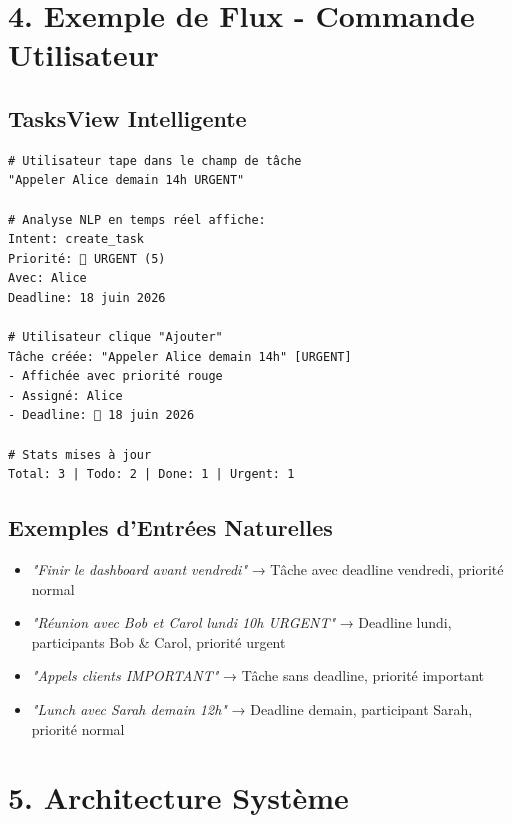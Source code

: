\documentclass[12pt,french]{article}
\begin{document}
\vspace{0.5cm}

\section*{4. Exemple de Flux - Commande Utilisateur}

\subsection*{TasksView Intelligente}
\begin{lstlisting}
# Utilisateur tape dans le champ de tâche
"Appeler Alice demain 14h URGENT"

# Analyse NLP en temps réel affiche:
Intent: create_task
Priorité: 🔴 URGENT (5)
Avec: Alice
Deadline: 18 juin 2026

# Utilisateur clique "Ajouter"
Tâche créée: "Appeler Alice demain 14h" [URGENT]
- Affichée avec priorité rouge
- Assigné: Alice
- Deadline: 📅 18 juin 2026

# Stats mises à jour
Total: 3 | Todo: 2 | Done: 1 | Urgent: 1
\end{lstlisting}

\subsection*{Exemples d'Entrées Naturelles}
\begin{itemize}
    \item \textit{"Finir le dashboard avant vendredi"} → Tâche avec deadline vendredi, priorité normal
    \item \textit{"Réunion avec Bob et Carol lundi 10h URGENT"} → Deadline lundi, participants Bob \& Carol, priorité urgent
    \item \textit{"Appels clients IMPORTANT"} → Tâche sans deadline, priorité important
    \item \textit{"Lunch avec Sarah demain 12h"} → Deadline demain, participant Sarah, priorité normal
\end{itemize}

\vspace{0.5cm}

\section*{5. Architecture Système}
\end{document}
